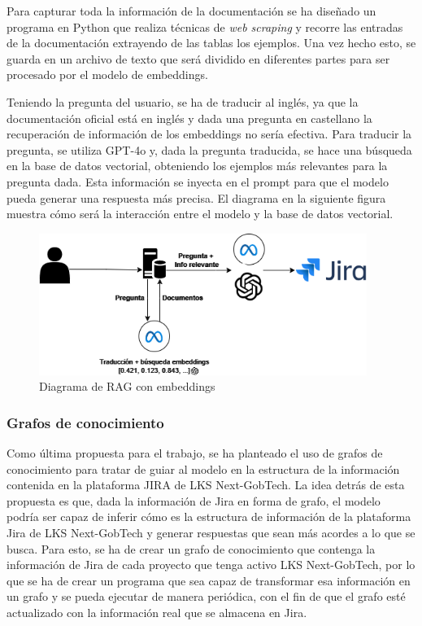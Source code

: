 Para capturar toda la información de la documentación se ha diseñado un programa en Python que realiza técnicas de \textit{web scraping} y recorre las entradas de la documentación extrayendo de las tablas los ejemplos. Una vez hecho esto, se guarda en un archivo de texto que será dividido en diferentes partes para ser procesado por el modelo de embeddings.

Teniendo la pregunta del usuario, se ha de traducir al inglés, ya que la documentación oficial está en inglés y dada una pregunta en castellano la recuperación de información de los embeddings no sería efectiva. Para traducir la pregunta, se utiliza GPT-4o y, dada la pregunta traducida, se hace una búsqueda en la base de datos vectorial, obteniendo los ejemplos más relevantes para la pregunta dada. Esta información se inyecta en el prompt para que el modelo pueda generar una respuesta más precisa. El diagrama en la siguiente figura muestra cómo será la interacción entre el modelo y la base de datos vectorial.

\begin{figure}[H]
    \centering
    \includegraphics[width=0.95\textwidth]{images/rag_embeddings.png}
    \caption{Diagrama de RAG con embeddings}\label{fig:embeddings}
\end{figure}

\newpage
\subsubsection{Grafos de conocimiento}
Como última propuesta para el trabajo, se ha planteado el uso de grafos de conocimiento para tratar de guiar al modelo en la estructura de la información contenida en la plataforma JIRA de LKS Next-GobTech. La idea detrás de esta propuesta es que, dada la información de Jira en forma de grafo, el modelo podría ser capaz de inferir cómo es la estructura de información de la plataforma Jira de LKS Next-GobTech y generar respuestas que sean más acordes a lo que se busca. Para esto, se ha de crear un grafo de conocimiento que contenga la información de Jira de cada proyecto que tenga activo LKS Next-GobTech, por lo que se ha de crear un programa que sea capaz de transformar esa información en un grafo y se pueda ejecutar de manera periódica, con el fin de que el grafo esté actualizado con la información real que se almacena en Jira.

